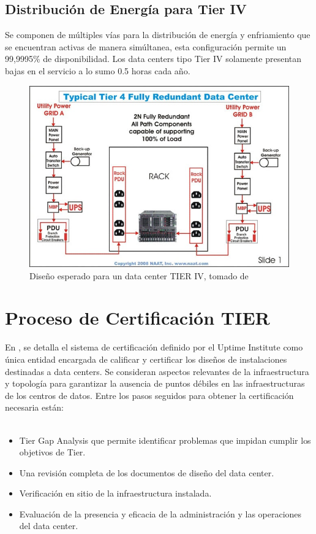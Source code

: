 \documentclass[journal]{IEEEtran}
\begin{document}
\subsection{Distribución de Energía para Tier IV}
Se componen de múltiples vías para la distribución de energía y enfriamiento que se encuentran activas de manera simúltanea, esta configuración permite un 99,9995\% de disponibilidad. Los data centers tipo Tier IV solamente presentan bajas en el servicio a lo sumo 0.5 horas cada año.
\begin{figure}
  \centering
  \includegraphics[scale=0.5]{tier-4-data-center.jpg}
  \caption{Diseño esperado para un data center TIER IV, tomado de \cite{naat}}
  \label{tierIV}
\end{figure}
\section{Proceso de Certificación TIER}
En \cite{george}, se detalla el sistema de certificación definido por el Uptime Institute como única entidad encargada de calificar y certificar los diseños de instalaciones destinadas a data centers. 
Se consideran aspectos relevantes de la infraestructura y topología para garantizar la ausencia de puntos débiles en las infraestructuras de los centros de datos.
Entre los pasos seguidos para obtener la certificación necesaria están:
\\
\\
\begin{itemize}
  \item Tier Gap Analysis que permite identificar problemas que impidan cumplir los objetivos de Tier.
  \item Una revisión completa de los documentos de diseño del data center.
  \item Verificación en sitio de la infraestructura instalada.
  \item Evaluación de la presencia y eficacia de la administración y las operaciones del data center.
\end{itemize}
\end{document}
